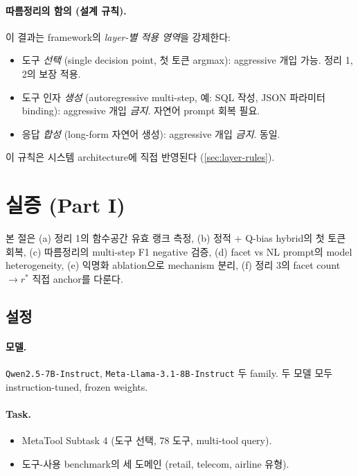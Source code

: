 \documentclass[11pt]{article}
\theoremstyle{definition}
\begin{document}
\paragraph{따름정리의 함의 (설계 규칙).}
이 결과는 framework의 \emph{layer-별 적용 영역}을 강제한다:
\begin{itemize}[leftmargin=*]
\item 도구 \emph{선택} (single decision point, 첫 토큰 argmax): aggressive 개입 가능. 정리 1, 2의 보장 적용.
\item 도구 인자 \emph{생성} (autoregressive multi-step, 예: SQL 작성, JSON 파라미터 binding): aggressive 개입 \emph{금지}. 자연어 prompt 회복 필요.
\item 응답 \emph{합성} (long-form 자연어 생성): aggressive 개입 \emph{금지}. 동일.
\end{itemize}
이 규칙은 시스템 architecture에 직접 반영된다 (\cref{sec:layer-rules}).

\section{실증 (Part I)}
\label{sec:experiments}

본 절은 (a) 정리 1의 함수공간 유효 랭크 측정, (b) 정적 + Q-bias hybrid의 첫 토큰 회복, (c) 따름정리의 multi-step F1 negative 검증, (d) facet vs NL prompt의 model heterogeneity, (e) 익명화 ablation으로 mechanism 분리, (f) 정리 3의 facet count $\to r^*$ 직접 anchor를 다룬다.

\subsection{설정}
\label{sec:exp-setup}

\paragraph{모델.}
\texttt{Qwen2.5-7B-Instruct}, \texttt{Meta-Llama-3.1-8B-Instruct} 두 family. 두 모델 모두 instruction-tuned, frozen weights.

\paragraph{Task.}
\begin{itemize}[leftmargin=*]
\item MetaTool Subtask 4 (도구 선택, 78 도구, multi-tool query).
\item 도구-사용 benchmark의 세 도메인 (retail, telecom, airline 유형).
\end{itemize}
\end{document}
